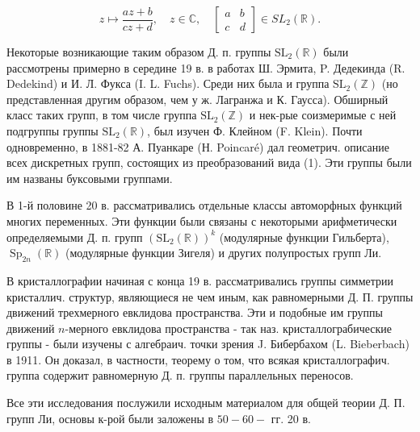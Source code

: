 \documentclass[10pt]{article}
\begin{document}
\[

z \mapsto \frac{a z+b}{c z+d}, \quad z \in \mathbb{C}, \quad\left[\begin{array}{ll}

a & b \\

c & d

\end{array}\right] \in S L_{2}(\mathbb{R}) .

\]



Некоторые возникающие таким образом Д. п. группы $\mathrm{SL}_{2}(\mathbb{R})$ были рассмотрены примерно в середине 19 в. в работах Ш. Эрмита, P. Дедекинда (R. Dedekind) и И. Л. Фукса (I. L. Fuchs). Среди них была и группа $\mathrm{SL}_{2}(\mathbb{Z})$ (но представленная другим образом, чем у ж. Лагранжа и К. Гаусса). Обширный класс таких групп, в том числе группа $\mathrm{SL}_{2}(\mathbb{Z})$ и нек-рые соизмеримые с ней подгруппы группы $\mathrm{SL}_{2}(\mathbb{R})$, был изучен Ф. Клейном (F. Klein). Почти одновременно, в 1881-82 А. Пуанкаре (Н. Poincaré) дал геометрич. описание всех дискретных групп, состоящих из преобразований вида (1). Эти группы были им названы буксовыми группами.



В 1-й половине 20 в. рассматривались отдельные классы автоморфных функций многих переменных. Эти функции были связаны с некоторыми арифметически определяемыми Д. п. групп $\left(\mathrm{SL}_{2}(\mathbb{R})\right)^{k}$ (модулярные функции Гильберта), $\operatorname{Sp}_{2 n}(\mathbb{R})$ (модулярные функции Зигеля) и других полупростых групп Ли.



В кристаллографии начиная с конца 19 в. рассматривались группы симметрии кристаллич. структур, являющиеся не чем иным, как равномерными Д. П. группы движений трехмерного евклидова пространства. Эти и подобные им группы движений $n$-мерного евклидова пространства - так наз. кристаллограбические группы - были изучены с алгебраич. точки зрения J. Бибербахом (L. Bieberbach) в 1911. Он доказал, в частности, теорему о том, что всякая кристаллографич. группа содержит равномерную Д. п. группы параллельных переносов.



Все эти исследования послужили исходным материалом для общей теории Д. П. групп Ли, основы к-рой были заложены в $50-60-$ гг. 20 в.
\end{document}
